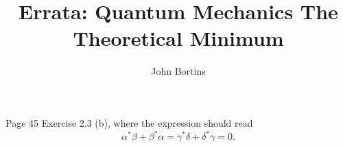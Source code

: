 \documentclass{article}
\title{Errata: Quantum Mechanics The Theoretical Minimum}
\author{John Bortins}
\begin{document}
\maketitle{}


Page 45 Exercise 2.3 (b), where the expression should read $$\alpha^{*}\beta+\beta^{*}\alpha=\gamma^{*}\delta+\delta^{*}\gamma=0.$$
\end{document}
